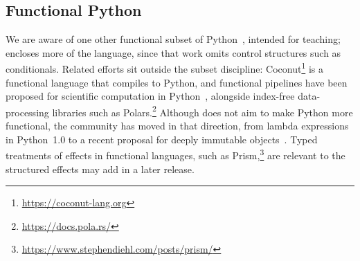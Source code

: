 \subsection{Functional Python}

We are aware of one other functional subset of Python~\cite{sunderraman2025}, intended for teaching; \PurePy
encloses more of the language, since that work omits control structures such as conditionals. Related efforts
sit outside the subset discipline: Coconut\footnote{\url{https://coconut-lang.org}} is a functional language that compiles to Python, and
functional pipelines have been proposed for scientific computation in Python~\cite{zhang2024}, alongside
index-free data-processing libraries such as Polars.\footnote{\url{https://docs.pola.rs/}} Although \PurePy does not aim to make Python
more functional, the community has moved in that direction, from lambda expressions in Python~1.0 to a recent
proposal for deeply immutable objects~\cite{johnson2025}. Typed treatments of effects in functional languages,
such as Prism,\footnote{\url{https://www.stephendiehl.com/posts/prism/}} are relevant to the structured effects \PurePy may add in a later release.
